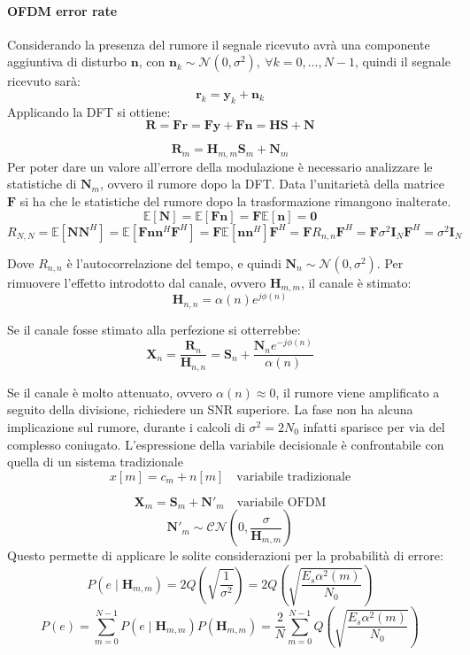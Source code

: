 \paragraph*{OFDM error rate}
Considerando la presenza del rumore il segnale ricevuto avrà una componente aggiuntiva di disturbo $\mathbf{n}$, con $\mathbf{n}_k \sim \mathcal{N}(0, \sigma^2), \ \forall k = 0, \ldots, N-1$, quindi il segnale ricevuto sarà:
\[
    \mathbf{r}_k = \mathbf{y}_k + \mathbf{n}_k
\]
Applicando la DFT si ottiene:
\[
    \mathbf{R} = \mathbf{F}\mathbf{r} = \mathbf{F}\mathbf{y} + \mathbf{F}\mathbf{n} = \mathbf{H}\mathbf{S} + \mathbf{N}
\]

\[
    \mathbf{R}_{m} = \mathbf{H}_{m, m}\mathbf{S}_{m} + \mathbf{N}_{m}
\]
Per poter dare un valore all'errore della modulazione è necessario analizzare le statistiche di $\mathbf{N}_{m}$, ovvero il rumore dopo la DFT.
Data l'unitarietà della matrice $\mathbf{F}$ si ha che le statistiche del rumore dopo la trasformazione rimangono inalterate.
\[
    \mathbb{E}[\mathbf{N}] = \mathbb{E}[\mathbf{F}\mathbf{n}] = \mathbf{F} \mathbb{E}[\mathbf{n}] = \mathbf{0}
\]  
\[
    R_{N,N} = \mathbb{E}[\mathbf{N}\mathbf{N}^H] = \mathbb{E}[\mathbf{F}\mathbf{n}\mathbf{n}^H\mathbf{F}^H] = \mathbf{F}\mathbb{E}[\mathbf{n}\mathbf{n}^H]\mathbf{F}^H = \mathbf{F}R_{n,n}\mathbf{F}^H = \mathbf{F} \sigma^2 \mathbf{I}_N \mathbf{F}^H = \sigma^2 \mathbf{I}_N
\]

Dove $R_{n,n}$ è l'autocorrelazione del tempo, e quindi $\mathbf{N}_{n} \sim \mathcal{N}(0, \sigma^2)$.
Per rimuovere l'effetto introdotto dal canale, ovvero $\mathbf{H}_{m,m}$, il canale è stimato:
\[
    \mathbf{H}_{n, n}= \alpha(n) e^{j\phi(n)}
\]

Se il canale fosse stimato alla perfezione si otterrebbe:
\[
    \mathbf{X}_{n} = \frac{\mathbf{R}_{n}}{\mathbf{H}_{n, n}} = \mathbf{S}_{n} + \frac{\mathbf{N}_{n} e^{-j\phi(n)}}{\alpha(n)}
\]


Se il canale è molto attenuato, ovvero $\alpha(n) \approx 0$, il rumore viene amplificato a seguito della divisione, richiedere un SNR superiore.
La fase non ha alcuna implicazione sul rumore, durante i calcoli di $\sigma ^2=2N_0$ infatti sparisce per via del complesso coniugato.
L'espressione della variabile decisionale è confrontabile con quella di un sistema tradizionale
\[
    x[m] = c_m + n[m] \quad \text{variabile tradizionale}
\]

\[
    \mathbf{X}_{m} = \mathbf{S}_{m} + \mathbf{N}'_{m} \quad \text{variabile OFDM}
\]
\[
    \mathbf{N}'_{m} \sim \mathcal{CN}(0, \frac{\sigma}{\mathbf{H}_{m, m}})
\]
Questo permette di applicare le solite considerazioni per la probabilità di errore:
\[
    P(e \mid \mathbf{H}_{m, m}) = 2 Q\left( \sqrt{\frac{1}{\sigma^2}}  \right) = 2 Q\left( \sqrt{\frac{E_s \alpha^2(m)}{N_0}}  \right) 
\]
\[
    P(e) = \sum_{m=0}^{N-1} P(e \mid \mathbf{H}_{m, m})P(\mathbf{H}_{m,m}) = \frac{2}{N} \sum_{m=0}^{N-1} Q\left( \sqrt{\frac{E_s \alpha^2(m)}{N_0}}  \right)
\]





